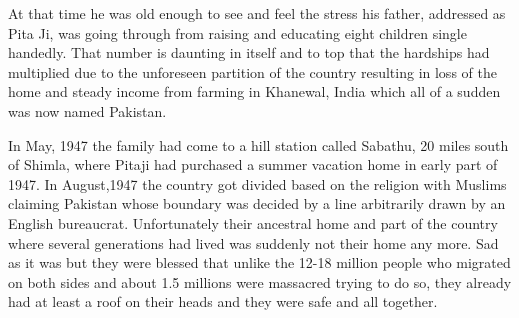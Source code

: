 At that time he was old enough to see and feel the stress his father,
addressed as Pita Ji, was going through from raising and educating eight
children single handedly. That number is daunting in itself and to top
that the hardships had multiplied due to the unforeseen partition of the
country resulting in loss of the home and steady income from farming in
Khanewal, India which all of a sudden was now named Pakistan.

In May, 1947 the family had come to a hill station called Sabathu, 20
miles south of Shimla, where Pitaji had purchased a summer vacation home
in early part of 1947. In August,1947 the country got divided based on
the religion with Muslims claiming Pakistan whose boundary was decided
by a line arbitrarily drawn by an English bureaucrat. Unfortunately
their ancestral home and part of the country where several generations
had lived was suddenly not their home any more. Sad as it was but they
were blessed that unlike the 12-18 million people who migrated on both
sides and about 1.5 millions were massacred trying to do so, they
already had at least a roof on their heads and they were safe and all
together.


